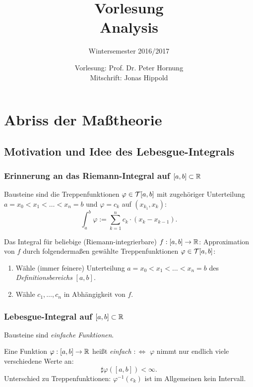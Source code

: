 \documentclass[
 a4paper,
 12pt,
 parskip=half
 ]{scrartcl}
\title{Vorlesung\\Analysis}
\subtitle{Wintersemester 2016/2017}
\author{Vorlesung: Prof. Dr. Peter Hornung\\Mitschrift: Jonas Hippold}
\theoremstyle{plain}
\theoremstyle{definition}
\numberwithin{equation}{section}
\begin{document}
\maketitle

\tableofcontents

\clearpage

\setcounter{section}{10}
\section{Abriss der Maßtheorie}
\subsection*{Motivation und Idee des Lebesgue-Integrals}
\subsubsection*{Erinnerung an das Riemann-Integral auf $[a,b] \subset \mathbb{R}$}
Bausteine sind die Treppenfunktionen $\varphi \in \mathcal{T}[a,b]$ mit zugehöriger Unterteilung $a = x_0 < x_1 < \ldots < x_n = b$ und $\varphi = c_k$ auf $(x_{k_1},x_k)$:
\[ \int_a^b \varphi := \sum_{k=1}^n c_k \cdot (x_k - x_{k-1}). \]

Das Integral für beliebige (Riemann-integrierbare) $f:[a,b]\to\mathbb{R}$: Approximation von $f$ durch folgendermaßen gewählte Treppenfunktionen $\varphi \in \mathcal{T}[a,b]$:
\begin{enumerate}
 \item Wähle (immer feinere) Unterteilung $a = x_0 < x_1 < \ldots < x_n = b$ des \emph{Definitionsbereichs} $[a,b]$.
 \item Wähle $c_1, \ldots, c_n$ in Abhängigkeit von $f$.
\end{enumerate}

\subsubsection*{Lebesgue-Integral auf $[a,b] \subset \mathbb{R}$}
Bausteine sind \emph{einfache Funktionen}.

Eine Funktion $\varphi: [a,b] \to \mathbb{R}$ heißt \emph{einfach} $:\Leftrightarrow$ $\varphi$ nimmt nur endlich viele verschiedene Werte an:
\[ \sharp \varphi([a,b]) < \infty. \]
Unterschied zu Treppenfunktionen: $\varphi^{-1}(c_k)$ ist im Allgemeinen kein Intervall.
\end{document}
